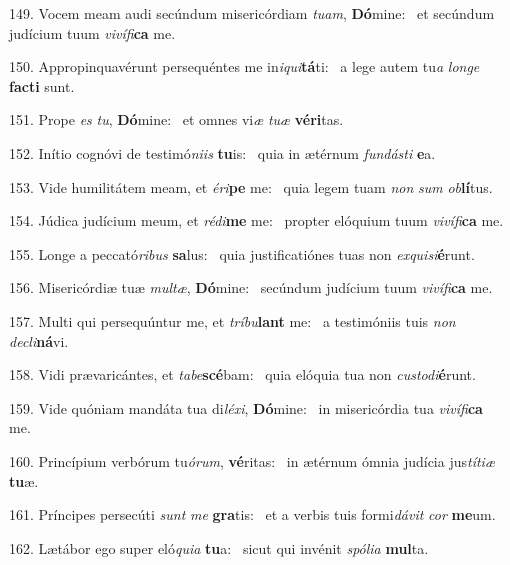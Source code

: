 149. Vocem meam audi secúndum misericórdiam \textit{tu}\textit{am}, \textbf{Dó}mine: \ast\  et secúndum judícium tuum \textit{vi}\textit{ví}\textit{fi}\textbf{ca} me.\

150. Appropinquavérunt persequéntes me in\textit{i}\textit{qui}\textbf{tá}ti: \ast\  a lege autem tu\textit{a} \textit{lon}\textit{ge} \textbf{fac}\textbf{ti} sunt.\

151. Prope \textit{es} \textit{tu}, \textbf{Dó}mine: \ast\  et omnes vi\textit{æ} \textit{tu}\textit{æ} \textbf{vé}\textbf{ri}tas.\

152. Inítio cognóvi de testimó\textit{ni}\textit{is} \textbf{tu}is: \ast\  quia in ætérnum \textit{fun}\textit{dás}\textit{ti} \textbf{e}a.\

153. Vide humilitátem meam, et \textit{é}\textit{ri}\textbf{pe} me: \ast\  quia legem tuam \textit{non} \textit{sum} \textit{ob}\textbf{lí}tus.\

154. Júdica judícium meum, et \textit{réd}\textit{i}\textbf{me} me: \ast\  propter elóquium tuum \textit{vi}\textit{ví}\textit{fi}\textbf{ca} me.\

155. Longe a peccató\textit{ri}\textit{bus} \textbf{sa}lus: \ast\  quia justificatiónes tuas non \textit{ex}\textit{qui}\textit{si}\textbf{é}runt.\

156. Misericórdiæ tuæ \textit{mul}\textit{tæ}, \textbf{Dó}mine: \ast\  secúndum judícium tuum \textit{vi}\textit{ví}\textit{fi}\textbf{ca} me.\

157. Multi qui persequúntur me, et \textit{trí}\textit{bu}\textbf{lant} me: \ast\  a testimóniis tuis \textit{non} \textit{de}\textit{cli}\textbf{ná}vi.\

158. Vidi prævaricántes, et \textit{ta}\textit{be}\textbf{scé}bam: \ast\  quia elóquia tua non \textit{cus}\textit{to}\textit{di}\textbf{é}runt.\

159. Vide quóniam mandáta tua di\textit{lé}\textit{xi}, \textbf{Dó}mine: \ast\  in misericórdia tua \textit{vi}\textit{ví}\textit{fi}\textbf{ca} me.\

160. Princípium verbórum tu\textit{ó}\textit{rum}, \textbf{vé}ritas: \ast\  in ætérnum ómnia judícia jus\textit{tí}\textit{ti}\textit{æ} \textbf{tu}æ.\

161. Príncipes persecúti \textit{sunt} \textit{me} \textbf{gra}tis: \ast\  et a verbis tuis formi\textit{dá}\textit{vit} \textit{cor} \textbf{me}um.\

162. Lætábor ego super eló\textit{qui}\textit{a} \textbf{tu}a: \ast\  sicut qui invénit \textit{spó}\textit{li}\textit{a} \textbf{mul}ta.\

